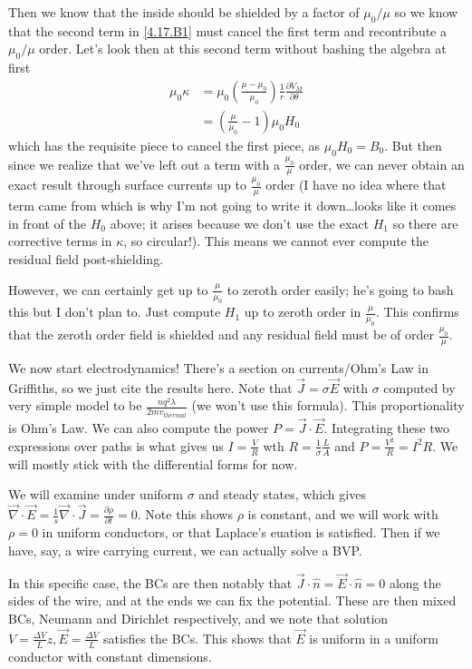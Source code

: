 \documentclass[10pt]{report}
\newcommand{\pd}[2]{\frac{\partial #1}{\partial#2}}
\begin{document}
Then we know that the inside should be shielded by a factor of $\mu_0/\mu$ so we know that the second term in \eqref{4.17.B1} must cancel the first term and recontribute a $\mu_0/\mu$ order. Let's look then at this second term without bashing the algebra at first
\begin{align}
    \mu_0\kappa &= \mu_0\left( \frac{\mu - \mu_0}{\mu_0} \right)\frac{1}{r}\pd{V_M}{\theta}\\
    &= \left( \frac{\mu}{\mu_0} - 1 \right)\mu_0H_0
\end{align}
which has the requisite piece to cancel the first piece, as $\mu_0H_0 = B_0$. But then since we realize that we've left out a term with a $\frac{\mu_0}{\mu}$ order, we can never obtain an exact result through surface currents up to $\frac{\mu_0}{\mu}$ order (I have no idea where that term came from which is why I'm not going to write it down\dots looks like it comes in front of the $H_0$ above; it arises because we don't use the exact $H_1$ so there are corrective terms in $\kappa$, so circular!). This means we cannot ever compute the residual field post-shielding.

However, we can certainly get up to $\frac{\mu}{\mu_0}$ to zeroth order easily; he's going to bash this but I don't plan to. Just compute $H_1$ up to zeroth order in $\frac{\mu}{\mu_0}$. This confirms that the zeroth order field is shielded and any residual field must be of order $\frac{\mu_0}{\mu}$.

We now start electrodynamics! There's a section on currents/Ohm's Law in Griffiths, so we just cite the results here. Note that $\vec{J} = \sigma \vec{E}$ with $\sigma$ computed by very simple model to be $\frac{nq^2\lambda}{2mv_{thermal}}$ (we won't use this formula). This proportionality is Ohm's Law. We can also compute the power $P = \vec{J}\cdot \vec{E}$. Integrating these two expressions over paths is what gives us $I = \frac{V}{R}$ wth $R = \frac{1}{\sigma}\frac{L}{A}$ and $P = \frac{V^2}{R} = I^2 R$. We will mostly stick with the differential forms for now.

We will examine under uniform $\sigma$ and steady states, which gives $\vec{\nabla}\cdot \vec{E} = \frac{1}{s}\vec{\nabla}\cdot \vec{J} = \pd{\rho}{t} = 0$. Note this shows $\rho$ is constant, and we will work with $\rho = 0$ in uniform conductors, or that Laplace's euation is satisfied. Then if we have, say, a wire carrying current, we can actually solve a BVP. 

In this specific case, the BCs are then notably that $\vec{J} \cdot \hat{n} = \vec{E}\cdot \hat{n} = 0$ along the sides of the wire, and at the ends we can fix the potential. These are then mixed BCs, Neumann and Dirichlet respectively, and we note that solution $V = \frac{\Delta V}{L}z, \vec{E} = \frac{\Delta V}{L}$ satisfies the BCs. This shows that $\vec{E}$ is uniform in a uniform conductor with constant dimensions.
\end{document}
